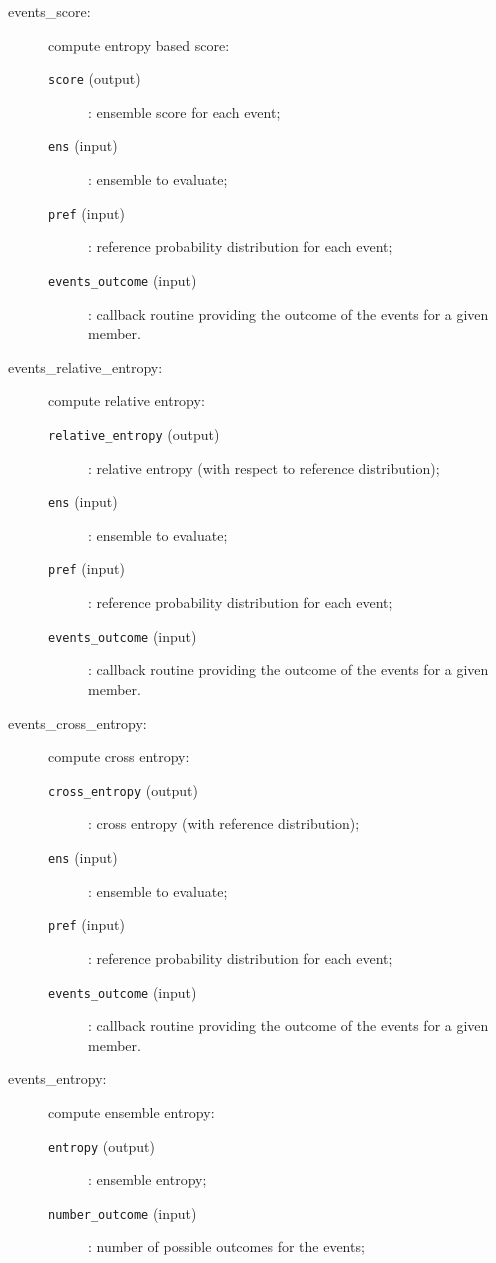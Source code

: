 \documentclass[11pt]{article}
\begin{document}
\begin{description}
\item[events\_score:] compute entropy based score:
  \begin{description}
  \item[{\tt score} (output)]: ensemble score for each event;
  \item[{\tt ens} (input)]: ensemble to evaluate;
  \item[{\tt pref} (input)]: reference probability distribution for each event;
  \item[{\tt events\_outcome} (input)]: callback routine providing the outcome
                                        of the events for a given member.
  \end{description}
\item[events\_relative\_entropy:] compute relative entropy:
  \begin{description}
  \item[{\tt relative\_entropy} (output)]: relative entropy (with respect to reference distribution);
  \item[{\tt ens} (input)]: ensemble to evaluate;
  \item[{\tt pref} (input)]: reference probability distribution for each event;
  \item[{\tt events\_outcome} (input)]: callback routine providing the outcome
                                        of the events for a given member.
  \end{description}
\item[events\_cross\_entropy:] compute cross entropy:
  \begin{description}
  \item[{\tt cross\_entropy} (output)]: cross entropy (with reference distribution);
  \item[{\tt ens} (input)]: ensemble to evaluate;
  \item[{\tt pref} (input)]: reference probability distribution for each event;
  \item[{\tt events\_outcome} (input)]: callback routine providing the outcome
                                        of the events for a given member.
  \end{description}
\item[events\_entropy:] compute ensemble entropy:
  \begin{description}
  \item[{\tt entropy} (output)]: ensemble entropy;
  \item[{\tt number\_outcome} (input)]: number of possible outcomes for the events;

\end{description}
\end{description}
\end{document}
